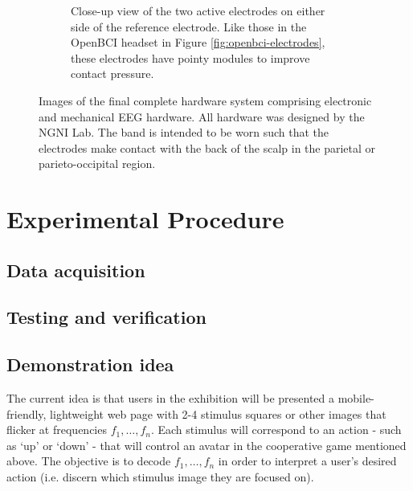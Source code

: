 \begin{figure}
\begin{subfigure}[c]{0.48\textwidth}
         \caption{Close-up view of the two active electrodes on either side of the reference electrode. Like those in the OpenBCI headset in Figure \ref{fig:openbci-electrodes}, these electrodes have pointy modules to improve contact pressure.}
         \label{fig:final-headband-electrodes}
     \end{subfigure}
        \caption{Images of the final complete hardware system comprising electronic and mechanical EEG hardware. All hardware was designed by the NGNI Lab. The band is intended to be worn such that the electrodes make contact with the back of the scalp in the parietal or parieto-occipital region.}
        \label{fig:final-headband-subfigs}
\end{figure}

\section{Experimental Procedure}
\subsection{Data acquisition}

\subsection{Testing and verification}

\subsection{Demonstration idea}
The current idea is that users in the exhibition will be presented a mobile-friendly, lightweight web page with 2-4 stimulus squares or other images that flicker at frequencies $f_1, \dots, f_n$. Each stimulus will correspond to an action - such as `up' or `down' - that will control an avatar in the cooperative game mentioned above. The objective is to decode $f_1, \dots, f_n$ in order to interpret a user's desired action (i.e. discern which stimulus image they are focused on).